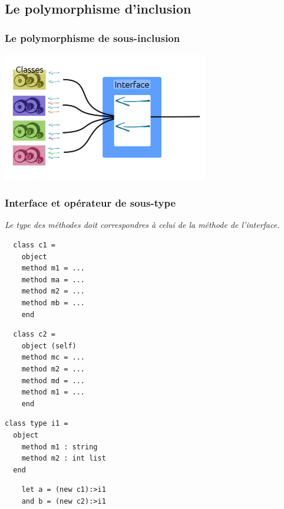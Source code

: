 \subsection{Le polymorphisme d'inclusion} %
\begin{frame}
	\frametitle{Le polymorphisme de sous-inclusion}
	\begin{center}
		\includegraphics[width=9cm]{pics/inclusionObjet.png}
	\end{center}
\end{frame}

\begin{frame}[fragile]
	\frametitle{Interface et opérateur de sous-type}
	\textit{Le type des méthodes doit correspondres à celui de la méthode de l'interface.}\\
	\begin{center}
		\begin{minipage}{0.4\textwidth}
			\lstset{basicstyle=\scriptsize}
  		\begin{lstlisting}
  class c1 =
    object
    method m1 = ...
    method ma = ...
    method m2 = ...
    method mb = ...
    end
			\end{lstlisting}
		\end{minipage}
		\begin{minipage}{0.4\textwidth}
		  \lstset{basicstyle=\scriptsize}
			\begin{lstlisting}
  class c2 =
    object (self)
    method mc = ...
    method m2 = ...
    method md = ...
    method m1 = ...
    end
			\end{lstlisting}
		\end{minipage}
	\end{center}
	\begin{center}
		\begin{minipage}{0.4\textwidth}
			\lstset{basicstyle=\footnotesize}
			\begin{lstlisting}
class type i1 =
  object
    method m1 : string
    method m2 : int list
  end
			\end{lstlisting}
		\end{minipage}
	\end{center}
	\begin{center}
		\begin{minipage}{0.4\textwidth}
			\lstset{basicstyle=\scriptsize}
			\begin{lstlisting}
    let a = (new c1):>i1
    and b = (new c2):>i1
			\end{lstlisting}
		\end{minipage}
	\end{center}
\end{frame}
